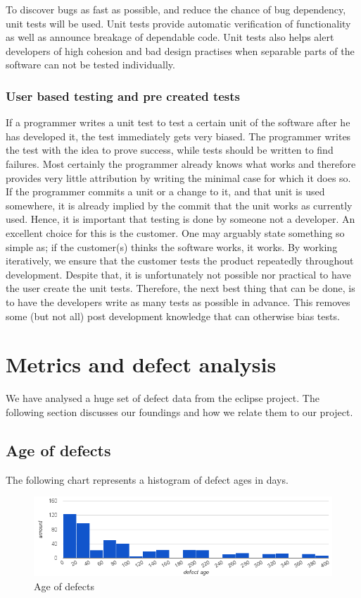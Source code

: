 \documentclass{article}
\begin{document}
To discover bugs as fast as possible, and reduce the chance of bug dependency, unit tests will be used.
Unit tests provide automatic verification of functionality as well as announce breakage of dependable code.
Unit tests also helps alert developers of high cohesion and bad design practises when separable parts of the software can not be tested individually.

\subsubsection{User based testing and pre created tests}
If a programmer writes a unit test to test a certain unit of the software after he has developed it, the test immediately gets very biased.
The programmer writes the test with the idea to prove success, while tests should be written to find failures.
Most certainly the programmer already knows what works and therefore provides very little attribution by writing the minimal case for which it does so. 
If the programmer commits a unit or a change to it, and that unit is used somewhere, it is already implied by the commit that the unit works as currently used.
Hence, it is important that testing is done by someone not a developer.
An excellent choice for this is the customer.
One may arguably state something so simple as; if the customer(s) thinks the software works, it works.
By working iteratively, we ensure that the customer tests the product repeatedly throughout development.
Despite that, it is unfortunately not possible nor practical to have the user create the unit tests.
Therefore, the next best thing that can be done, is to have the developers write as many tests as possible in advance.
This removes some (but not all) post development knowledge that can otherwise bias tests.

\section{Metrics and defect analysis}
We have analysed a huge set of defect data from the eclipse project.
The following section discusses our foundings and how we relate them to our project.

\subsection{Age of defects}
The following chart represents a histogram of defect ages in days.
\begin{figure}[h]
\center
\includegraphics[width=160mm]{defect_ages.png}
\caption{Age of defects}
\end{figure}
\end{document}
